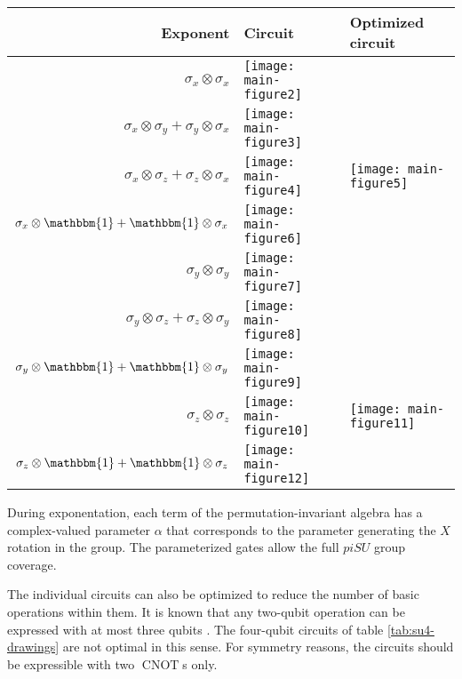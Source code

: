 \documentclass[%
 reprint,
 amsmath,amssymb,
 aps,
]{revtex4-2}
\newcommand{\CNOT}{\operatorname{CNOT}}
\theoremstyle{definition}%
\begin{document}
\begin{table*}
    \centering
        \caption{Corresponding circuits for the exponentials of the algebra elements in $pi\mathfrak{su}(4)$ as $\exp(-i\alpha/2 \sum_k \pi_k\bigotimes_{i=1}^2 \sigma_i)$. The circuits are constructed on a $\sigma_x \otimes \sigma_x$ backbone with changes to the qubit axis as necessary. For some circuits, there are optimized visions with fewer gates available.}
\begin{tabularx}{13.5cm}{r l l}
Exponent & Circuit & Optimized circuit\\\hline
$\sigma_x \otimes \sigma_x$ &\texttt{[image: main-figure2]}\\
$\sigma_x \otimes \sigma_y + \sigma_y \otimes \sigma_x$ & \texttt{[image: main-figure3]}\\
$\sigma_x \otimes \sigma_z + \sigma_z \otimes \sigma_x$ & \texttt{[image: main-figure4]} & \texttt{[image: main-figure5]}\\
$\sigma_x \otimes \mathbbm{1} + \mathbbm{1} \otimes \sigma_x$ & \texttt{[image: main-figure6]}\\
$\sigma_y \otimes \sigma_y$ & \texttt{[image: main-figure7]}\\
$\sigma_y \otimes \sigma_z + \sigma_z \otimes \sigma_y$ & \texttt{[image: main-figure8]}\\
$\sigma_y \otimes \mathbbm{1} + \mathbbm{1} \otimes \sigma_y$ & \texttt{[image: main-figure9]}\\
$\sigma_z \otimes \sigma_z$ & \texttt{[image: main-figure10]} & \texttt{[image: main-figure11]}\\
$\sigma_z \otimes \mathbbm{1} + \mathbbm{1} \otimes \sigma_z$ & \texttt{[image: main-figure12]}\\\hline
\end{tabularx}

    \label{tab:su4-drawings}
\end{table*}


During exponentation, each term of the permutation-invariant algebra has a complex-valued parameter $\alpha$ that corresponds to the parameter generating the $X$ rotation in the group. The parameterized gates allow the full $piSU$ group coverage.

The individual circuits can also be optimized to reduce the number of basic operations within them. It is known that any two-qubit operation can be expressed with at most three qubits \cite{vatan_optimal_2004, shende_minimal_2004}. The four-qubit circuits of table \ref{tab:su4-drawings} are not optimal in this sense. For symmetry reasons, the circuits should be expressible with two $\CNOT$s only.
\end{document}
